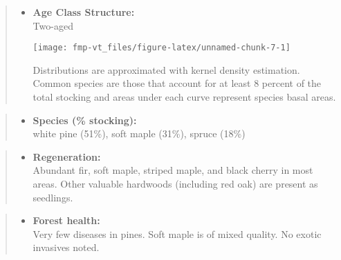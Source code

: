 \documentclass[]{tufte-handout}
\providecommand{\tightlist}{%
  \setlength{\itemsep}{0pt}\setlength{\parskip}{0pt}}
\begin{document}
\begin{quote}
\begin{itemize}
\tightlist
\item
  \textbf{Age Class Structure:}\\
  \vspace{2pt} Two-aged\\

  \begin{marginfigure}
  \texttt{[image: fmp-vt\_files/figure-latex/unnamed-chunk-7-1]} \caption[Distributions are approximated with kernel density estimation]{Distributions are approximated with kernel density estimation. Common species are those that account for at least 8 percent of the total stocking and areas under each curve represent species basal areas.}\label{fig:unnamed-chunk-7}
  \end{marginfigure}
\end{itemize}
\end{quote}

\begin{quote}
\begin{itemize}
\tightlist
\item
  \textbf{Species (\% stocking):}\\
  \vspace{2pt} white pine (51\%), soft maple (31\%), spruce (18\%)
\end{itemize}
\end{quote}

\begin{quote}
\begin{itemize}
\tightlist
\item
  \textbf{Regeneration:}\\
  \vspace{2pt} Abundant fir, soft maple, striped maple, and black cherry
  in most areas. Other valuable hardwoods (including red oak) are
  present as seedlings.
\end{itemize}
\end{quote}

\begin{quote}
\begin{itemize}
\tightlist
\item
  \textbf{Forest health:}\\
  \vspace{2pt} Very few diseases in pines. Soft maple is of mixed
  quality. No exotic invasives noted.
\end{itemize}
\end{quote}
\end{document}
